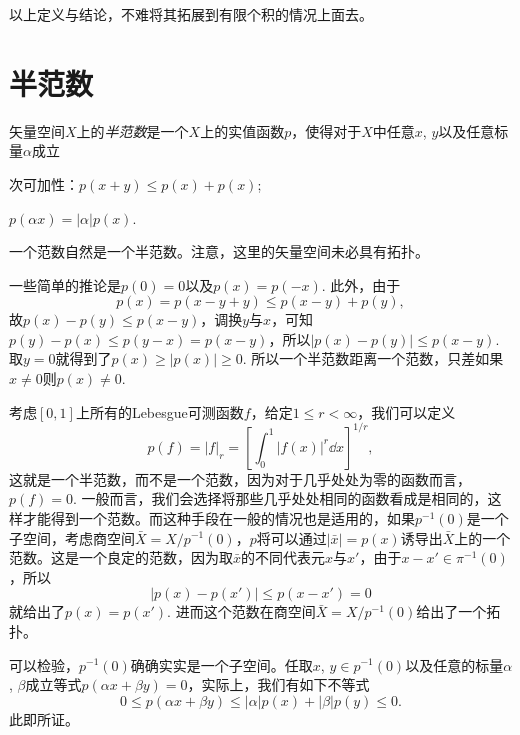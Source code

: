 以上定义与结论，不难将其拓展到有限个积的情况上面去。

\section{半范数}

\begin{para}
矢量空间$X$上的\textit{半范数}是一个$X$上的实值函数$p$，使得对于$X$中任意$x$, $y$以及任意标量$\alpha$成立
\begin{compactenum}
\item 次可加性：$p(x+y)\leq p(x)+p(x)$;
\item $p(\alpha x)=|\alpha|p(x)$.
\end{compactenum}
一个范数自然是一个半范数。注意，这里的矢量空间未必具有拓扑。

一些简单的推论是$p(0)=0$以及$p(x)=p(-x)$. 此外，由于
\[
	p(x)=p(x-y+y)\leq p(x-y)+p(y),
\]
故$p(x)-p(y)\leq p(x-y)$，调换$y$与$x$，可知$p(y)-p(x)\leq p(y-x)=p(x-y)$，所以$|p(x)-p(y)|\leq p(x-y)$. 取$y=0$就得到了$p(x)\geq |p(x)|\geq 0$. 所以一个半范数距离一个范数，只差如果$x\neq 0$则$p(x)\neq 0$.

考虑$[0,1]$上所有的Lebesgue可测函数$f$，给定$1\leq r<\infty$，我们可以定义
\[
	p(f)=|f|_r=\left[\int_{0}^{1}|f(x)|^r\dd x\right]^{1/r},
\]
这就是一个半范数，而不是一个范数，因为对于几乎处处为零的函数而言，$p(f)=0$. 一般而言，我们会选择将那些几乎处处相同的函数看成是相同的，这样才能得到一个范数。而这种手段在一般的情况也是适用的，如果$p^{-1}(0)$是一个子空间，考虑商空间$\bar{X}=X/p^{-1}(0)$，$p$将可以通过$|\bar{x}|=p(x)$诱导出$\bar{X}$上的一个范数。这是一个良定的范数，因为取$\bar{x}$的不同代表元$x$与$x'$，由于$x-x'\in \pi^{-1}(0)$，所以
\[
	|p(x)-p(x')|\leq p(x-x')=0
\]
就给出了$p(x)=p(x')$. 进而这个范数在商空间$\bar{X}=X/p^{-1}(0)$给出了一个拓扑。

可以检验，$p^{-1}(0)$确确实实是一个子空间。任取$x$, $y\in p^{-1}(0)$以及任意的标量$\alpha$, $\beta$成立等式$p(\alpha x+\beta y)=0$，实际上，我们有如下不等式
\[
	0\leq p(\alpha x+\beta y)\leq |\alpha|p(x)+|\beta|p(y)\leq 0.
\]
此即所证。
\end{para}




